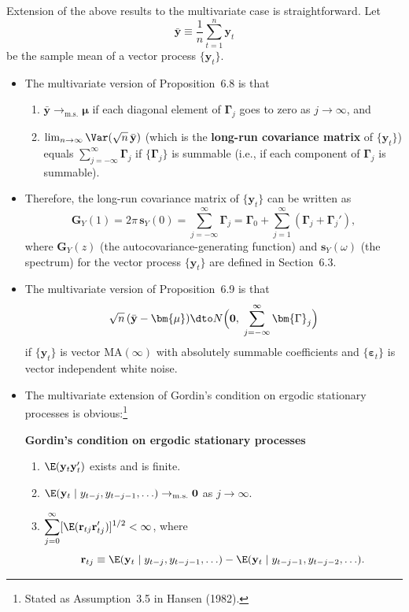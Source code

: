 Extension of the above results to the multivariate case is straightforward. Let
\[
  \bar{\mathbf{y}} \equiv \frac{1}{n} \sum_{t=1}^{n} \mathbf{y}_t
\]
be the sample mean of a vector process $\{\mathbf{y}_t\}$.
\begin{itemize}
\item The multivariate version of Proposition~6.8 is that
\begin{enumerate}[label=(\alph*)]
\item $\bar{\mathbf{y}} \to_{\mathrm{m.s.}} \bm{\mu}$ if each diagonal element of $\bm{\Gamma}_j$ goes to zero as $j \to \infty$, and
\item $\lim_{n \to \infty} \Var(\sqrt{n}\,\bar{\mathbf{y}})$ (which is the \textbf{long-run covariance matrix} of $\{\mathbf{y}_t\}$) equals
$\sum_{j=-\infty}^{\infty} \bm{\Gamma}_j$ if $\{\bm{\Gamma}_j\}$ is summable (i.e., if each component of $\bm{\Gamma}_j$ is summable).
\end{enumerate}

\item Therefore, the long-run covariance matrix of $\{\mathbf{y}_t\}$ can be written as
\begin{equation}
  \mathbf{G}_Y(1) = 2\pi\,\mathbf{s}_Y(0) = \sum_{j=-\infty}^{\infty} \bm{\Gamma}_j
  = \bm{\Gamma}_0 + \sum_{j=1}^{\infty} (\bm{\Gamma}_j + \bm{\Gamma}_j'),
  \label{eq:6.5.6}
\end{equation}
where $\mathbf{G}_Y(z)$ (the autocovariance-generating function) and $\mathbf{s}_Y(\omega)$ (the spectrum)
for the vector process $\{\mathbf{y}_t\}$ are defined in Section~6.3.

\item The multivariate version of Proposition~6.9 is that
\begin{equation}
  \sqrt{n}\,(\bar{\mathbf{y}} - \bm{\mu}) \dto N\Bigl(\mathbf{0},\; \sum_{j=-\infty}^{\infty} \bm{\Gamma}_j\Bigr)
  \label{eq:6.5.7}
\end{equation}
if $\{\mathbf{y}_t\}$ is vector $\text{MA}(\infty)$ with absolutely summable coefficients and $\{\bm{\varepsilon}_t\}$ is vector
independent white noise.

\item The multivariate extension of Gordin's condition on ergodic stationary processes
is obvious:\footnote{Stated as Assumption~3.5 in Hansen (1982).}

\textbf{Gordin's condition on ergodic stationary processes}
\begin{enumerate}[label=(\alph*)]
\item $\E(\mathbf{y}_t \mathbf{y}_t')$ exists and is finite.
\item $\E(\mathbf{y}_t \mid y_{t-j}, y_{t-j-1}, \ldots) \to_{\mathrm{m.s.}} \mathbf{0}$ as $j \to \infty$.
\item $\displaystyle \sum_{j=0}^{\infty} [\E(\mathbf{r}_{tj} \mathbf{r}_{tj}')]^{1/2} < \infty$, where
\[
  \mathbf{r}_{tj} \equiv \E(\mathbf{y}_t \mid y_{t-j}, y_{t-j-1}, \ldots)
  - \E(\mathbf{y}_t \mid y_{t-j-1}, y_{t-j-2}, \ldots).
\]
\end{enumerate}


\end{itemize}
